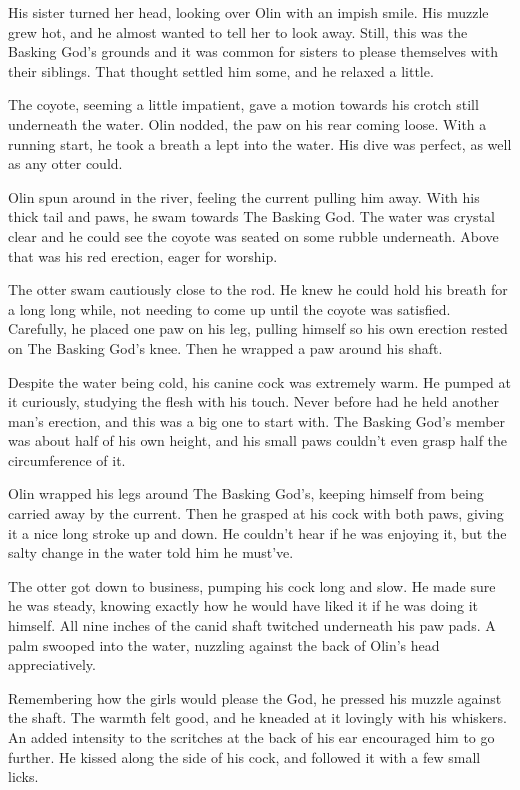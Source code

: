 His sister turned her head, looking over Olin with an impish smile. His muzzle grew hot, and he almost wanted to tell her to look away. Still, this was the Basking God's grounds and it was common for sisters to please themselves with their siblings. That thought settled him some, and he relaxed a little.

The coyote, seeming a little impatient, gave a motion towards his crotch still underneath the water. Olin nodded, the paw on his rear coming loose. With a running start, he took a breath a lept into the water. His dive was perfect, as well as any otter could.

Olin spun around in the river, feeling the current pulling him away. With his thick tail and paws, he swam towards The Basking God. The water was crystal clear and he could see the coyote was seated on some rubble underneath. Above that was his red erection, eager for worship.

The otter swam cautiously close to the rod. He knew he could hold his breath for a long long while, not needing to come up until the coyote was satisfied. Carefully, he placed one paw on his leg, pulling himself so his own erection rested on The Basking God's knee. Then he wrapped a paw around his shaft.

Despite the water being cold, his canine cock was extremely warm. He pumped at it curiously, studying the flesh with his touch. Never before had he held another man's erection, and this was a big one to start with. The Basking God's member was about half of his own height, and his small paws couldn't even grasp half the circumference of it.

Olin wrapped his legs around The Basking God's, keeping himself from being carried away by the current. Then he grasped at his cock with both paws, giving it a nice long stroke up and down. He couldn't hear if he was enjoying it, but the salty change in the water told him he must've.

The otter got down to business, pumping his cock long and slow. He made sure he was steady, knowing exactly how he would have liked it if he was doing it himself. All nine inches of the canid shaft twitched underneath his paw pads. A palm swooped into the water, nuzzling against the back of Olin's head appreciatively.

Remembering how the girls would please the God, he pressed his muzzle against the shaft. The warmth felt good, and he kneaded at it lovingly with his whiskers. An added intensity to the scritches at the back of his ear encouraged him to go further. He kissed along the side of his cock, and followed it with a few small licks.

